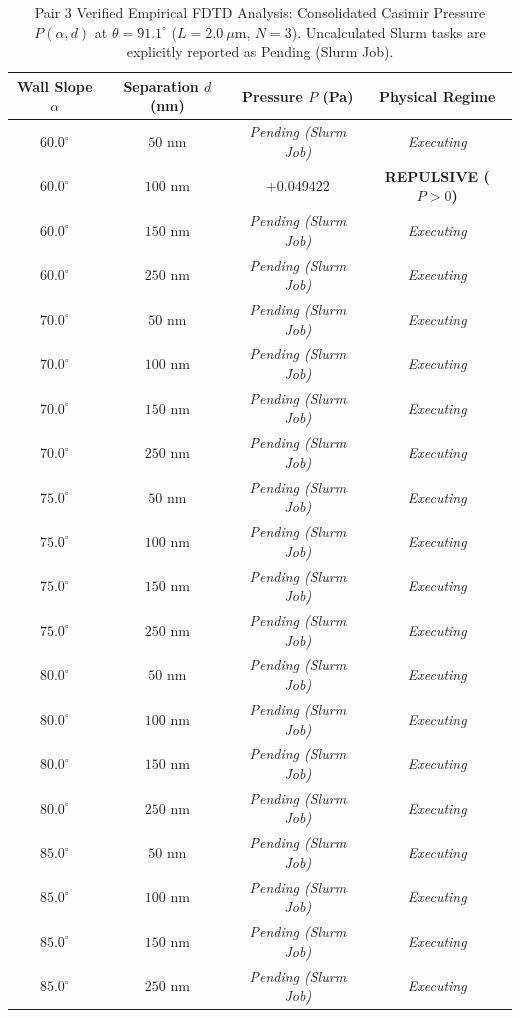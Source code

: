 \documentclass[12pt,letterpaper]{article}
\begin{document}
\begin{table}[h!]
\centering
\caption{Pair 3 Verified Empirical FDTD Analysis: Consolidated Casimir Pressure $P(\alpha, d)$ at $\theta = 91.1^\circ$ ($L=2.0\ \mu\text{m}$, $N=3$). Uncalculated Slurm tasks are explicitly reported as Pending (Slurm Job).}
\begin{tabular}{cccc}
\hline
\textbf{Wall Slope $\alpha$} & \textbf{Separation $d$ (nm)} & \textbf{Pressure $P$ (Pa)} & \textbf{Physical Regime} \\
\hline
$60.0^\circ$ & $50$ nm & \textit{Pending (Slurm Job)} & \textit{Executing} \\
$60.0^\circ$ & $100$ nm & $+0.049422$ & \textbf{REPULSIVE ($P>0$)} \\
$60.0^\circ$ & $150$ nm & \textit{Pending (Slurm Job)} & \textit{Executing} \\
$60.0^\circ$ & $250$ nm & \textit{Pending (Slurm Job)} & \textit{Executing} \\
$70.0^\circ$ & $50$ nm & \textit{Pending (Slurm Job)} & \textit{Executing} \\
$70.0^\circ$ & $100$ nm & \textit{Pending (Slurm Job)} & \textit{Executing} \\
$70.0^\circ$ & $150$ nm & \textit{Pending (Slurm Job)} & \textit{Executing} \\
$70.0^\circ$ & $250$ nm & \textit{Pending (Slurm Job)} & \textit{Executing} \\
$75.0^\circ$ & $50$ nm & \textit{Pending (Slurm Job)} & \textit{Executing} \\
$75.0^\circ$ & $100$ nm & \textit{Pending (Slurm Job)} & \textit{Executing} \\
$75.0^\circ$ & $150$ nm & \textit{Pending (Slurm Job)} & \textit{Executing} \\
$75.0^\circ$ & $250$ nm & \textit{Pending (Slurm Job)} & \textit{Executing} \\
$80.0^\circ$ & $50$ nm & \textit{Pending (Slurm Job)} & \textit{Executing} \\
$80.0^\circ$ & $100$ nm & \textit{Pending (Slurm Job)} & \textit{Executing} \\
$80.0^\circ$ & $150$ nm & \textit{Pending (Slurm Job)} & \textit{Executing} \\
$80.0^\circ$ & $250$ nm & \textit{Pending (Slurm Job)} & \textit{Executing} \\
$85.0^\circ$ & $50$ nm & \textit{Pending (Slurm Job)} & \textit{Executing} \\
$85.0^\circ$ & $100$ nm & \textit{Pending (Slurm Job)} & \textit{Executing} \\
$85.0^\circ$ & $150$ nm & \textit{Pending (Slurm Job)} & \textit{Executing} \\
$85.0^\circ$ & $250$ nm & \textit{Pending (Slurm Job)} & \textit{Executing} \\
\hline
\end{tabular}
\end{table}
\end{document}
